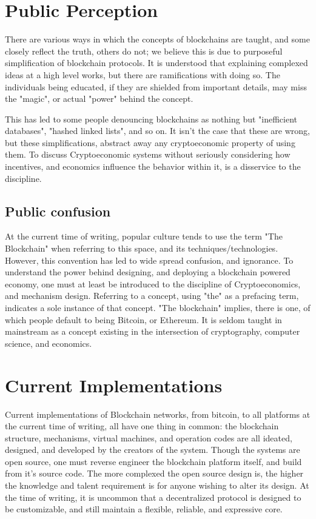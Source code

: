 \documentclass[12pt, titlepage, twocolumn]{report}
\begin{document}
\section{Public Perception}
There are various ways in which the concepts of blockchains are taught, and some closely reflect the truth, others do not; we believe this is due to purposeful simplification of blockchain protocols. It is understood that explaining complexed ideas at a high level works, but there are ramifications with doing so. The individuals being educated, if they are shielded from important details, may miss the "magic", or actual "power" behind the concept.  

This has led to some people denouncing blockchains as nothing but "inefficient databases", "hashed linked lists", and so on. It isn't the case that these are wrong, but these simplifications, abstract away any cryptoeconomic property of using them. To discuss Cryptoeconomic systems without seriously considering how incentives, and economics influence the behavior within it, is a disservice to the discipline.




\subsection{Public confusion}
At the current time of writing, popular culture tends to use the term "The Blockchain" when referring to this space, and its techniques/technologies. However, this convention has led to wide spread confusion, and ignorance. To understand the power behind designing, and deploying a blockchain powered economy, one must at least be introduced to the discipline of Cryptoeconomics, and mechanism design. Referring to a concept, using "the" as a prefacing term, indicates a sole instance of that concept. "The blockchain" implies, there is one, of which people default to being Bitcoin, or Ethereum. It is seldom taught in mainstream as a concept existing in the intersection of cryptography, computer science, and economics. 




\section{Current Implementations}
Current implementations of Blockchain networks, from bitcoin, to all platforms at the current time of writing, all have one thing in common: the blockchain structure, mechanisms, virtual machines, and operation codes are all ideated, designed, and developed by the creators of the system. Though the systems are open source, one must reverse engineer the blockchain platform itself, and build from it's source code. The more complexed the open source design is, the higher the knowledge and talent requirement is for anyone wishing to alter its design. At the time of writing, it is uncommon that a decentralized protocol is designed to be customizable, and still maintain a flexible, reliable, and expressive core.
\end{document}
